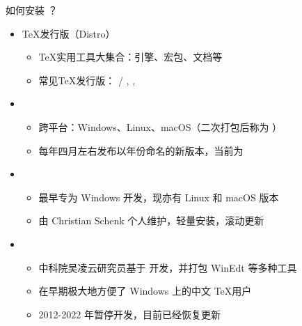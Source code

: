 \begin{frame}{如何安装 ？}
  \begin{itemize}
    \item \TeX{}发行版（Distro）
      \begin{itemize}
        \item \TeX{}实用工具大集合：引擎、宏包、文档等
        \item 常见\TeX{}发行版：
          \alert{\TL{} / \MacTeX}, \CTeX, \MiKTeX
      \end{itemize}
    \item \TL
      \begin{itemize}
        \item 跨平台：Windows、Linux、macOS（二次打包后称为 \MacTeX）
        \item 每年四月左右发布以年份命名的新版本，当前为 \TL \TLVersion
      \end{itemize}
    \item \MiKTeX
      \begin{itemize}
        \item 最早专为 Windows 开发，现亦有 Linux 和 macOS 版本
        \item 由 Christian Schenk 个人维护，轻量安装，滚动更新
      \end{itemize}
    \item \CTeX
      \begin{itemize}
        \item 中科院吴凌云研究员基于 \MiKTeX 开发，并打包 WinEdt 等多种工具
        \item 在早期极大地方便了 Windows 上的中文 \TeX 用户
        \item 2012-2022 年暂停开发，目前已经恢复更新
      \end{itemize}
  \end{itemize}
\end{frame}


